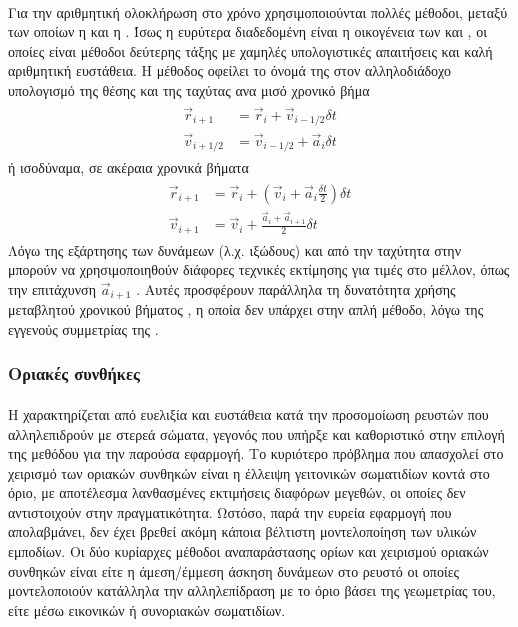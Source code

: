 \paragraph{} Για την αριθμητική ολοκλήρωση στο χρόνο χρησιμοποιούνται πολλές μέθοδοι,
μεταξύ των οποίων η  και η . Ίσως η
ευρύτερα διαδεδομένη είναι η οικογένεια των  και ,
οι οποίες είναι μέθοδοι δεύτερης τάξης με χαμηλές υπολογιστικές απαιτήσεις και καλή
αριθμητική ευστάθεια. Η μέθοδος  οφείλει το όνομά της στον αλληλοδιάδοχο
υπολογισμό της θέσης και της ταχύτας ανα μισό χρονικό βήμα
\begin{align}
  \begin{split}
    \label{eq:leapfrog}
    \vec{r}_{i+1} &= \vec{r}_i + \vec{v}_{i-1/2} \delta t \\
    \vec{v}_{i+1/2} &= \vec{v}_{i-1/2} + \vec{a}_i \delta t
  \end{split}
\end{align}
ή ισοδύναμα, σε ακέραια χρονικά βήματα
\begin{align}
  \begin{split}
    \label{eq:leapfrog}
    \vec{r}_{i+1} &= \vec{r}_i + \left( \vec{v}_i + \vec{a}_i \frac{\delta t}{2} \right) \delta t \\
    \vec{v}_{i+1} &= \vec{v}_i + \frac{\vec{a}_i + \vec{a}_{i+1}}{2} \delta t
  \end{split}
\end{align}
Λόγω της εξάρτησης των δυνάμεων (λ.χ. ιξώδους) και από την ταχύτητα στην  μπορούν
να χρησιμοποιηθούν διάφορες τεχνικές εκτίμησης για τιμές στο μέλλον, όπως την επιτάχυνση
$\vec{a}_{i+1}$
\cite{rawiraswattana2012dynamics}.  Αυτές προσφέρουν παράλληλα τη δυνατότητα χρήσης
μεταβλητού χρονικού βήματος \cite{springel2001gadget}, η οποία δεν υπάρχει στην απλή
 μέθοδο, λόγω της εγγενούς συμμετρίας της \cite{skeel1993variable}.

\subsubsection{Οριακές συνθήκες}
\paragraph{} Η  χαρακτηρίζεται από ευελιξία και ευστάθεια κατά την προσομοίωση
ρευστών που αλληλεπιδρούν με στερεά σώματα, γεγονός που υπήρξε και καθοριστικό στην
επιλογή της μεθόδου για την παρούσα εφαρμογή. Το κυριότερο πρόβλημα που απασχολεί στο
χειρισμό των οριακών συνθηκών είναι η έλλειψη γειτονικών σωματιδίων κοντά στο όριο, με
αποτέλεσμα λανθασμένες εκτιμήσεις διαφόρων μεγεθών, οι οποίες δεν αντιστοιχούν στην
πραγματικότητα. Ωστόσο, παρά την ευρεία εφαρμογή που απολαβμάνει, δεν έχει βρεθεί ακόμη
κάποια βέλτιστη μοντελοποίηση των υλικών εμποδίων. Οι δύο κυρίαρχες μέθοδοι αναπαράστασης
ορίων και χειρισμού οριακών συνθηκών είναι είτε η άμεση/έμμεση άσκηση δυνάμεων στο ρευστό
οι οποίες μοντελοποιούν κατάλληλα την αλληλεπίδραση με το όριο βάσει της γεωμετρίας του,
είτε μέσω εικονικών ή συνοριακών σωματιδίων.

